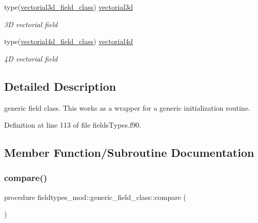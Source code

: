 \begin{DoxyCompactItemize}
type(\mbox{\hyperlink{structfieldtypes__mod_1_1vectorial3d__field__class}{vectorial3d\+\_\+field\+\_\+class}}) \mbox{\hyperlink{structfieldtypes__mod_1_1generic__field__class_aff0ebfb0a2e374714172bd0e7202f036}{vectorial3d}}
\begin{DoxyCompactList}\small\item\em 3D vectorial field \end{DoxyCompactList}\item 
type(\mbox{\hyperlink{structfieldtypes__mod_1_1vectorial4d__field__class}{vectorial4d\+\_\+field\+\_\+class}}) \mbox{\hyperlink{structfieldtypes__mod_1_1generic__field__class_a9a4f0f601cf52de94dcbbaa0a48bcf95}{vectorial4d}}
\begin{DoxyCompactList}\small\item\em 4D vectorial field \end{DoxyCompactList}\end{DoxyCompactItemize}


\subsection{Detailed Description}
generic field class. This works as a wrapper for a generic initialization routine. 

Definition at line 113 of file fields\+Types.\+f90.



\subsection{Member Function/\+Subroutine Documentation}
\mbox{\label{structfieldtypes__mod_1_1generic__field__class_a8dec8ff3e2f37167c4952805f5d189e9}} 
\subsubsection{\texorpdfstring{compare()}{compare()}}
{\footnotesize\ttfamily procedure fieldtypes\+\_\+mod\+::generic\+\_\+field\+\_\+class\+::compare (\begin{DoxyParamCaption}{ }\end{DoxyParamCaption})\hspace{0.3cm}{\ttfamily [private]}}



